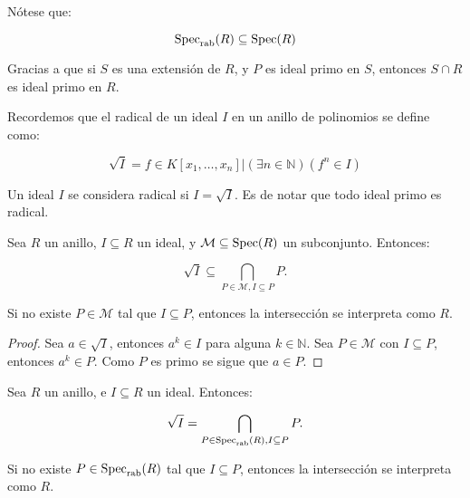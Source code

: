 Nótese que:

$$ \textrm{Spec}_{\textrm{rab}}(R) \subseteq \textrm{Spec}(R) $$

Gracias a que si $S$ es una extensión de $R$, y $P$ es ideal primo en $S$, entonces $S \cap R$ es ideal primo en $R$.

Recordemos que el radical de un ideal $I$ en un anillo de polinomios se define como:

$$\sqrt{I} = {f \in K[x_1,\dots,x_n]|(\exists n \in \mathbb{N}) (f^n \in I)}$$

Un ideal $I$ se considera radical si $I = \sqrt{I}$. Es de notar que todo ideal primo es radical.

\begin{lemma}\label{radical sub spec - nullstellensatz}
Sea $R$ un anillo, $I \subseteq R$ un ideal, y $\mathcal{M} \subseteq \textrm{Spec}(R)$ un subconjunto. Entonces:

$$\sqrt{I} \subseteq \bigcap_{P \in \mathcal{M}, I \subseteq P} P.$$

Si no existe $P \in \mathcal{M}$ tal que $I \subseteq P$, entonces la intersección se interpreta como $R$.

\end{lemma}
\begin{proof}
Sea $a \in \sqrt{I}$, entonces $a^k \in I$ para alguna $k \in \mathbb{N}$. Sea $P \in \mathcal{M}$ con $I \subseteq P$, entonces $a^k \in P$. Como $P$ es primo se sigue que $a \in P$.
\end{proof}

\begin{proposition}\label{radical = specrab - nullstellensatz}
Sea $R$ un anillo, e $I \subseteq R$ un ideal. Entonces:

$$\sqrt{I} = \bigcap_{P \in \textrm{Spec}_{\textrm{rab}}(R), I \subseteq P} P.$$

Si no existe $P \in \textrm{Spec}_{\textrm{rab}}(R)$ tal que $I \subseteq P$, entonces la intersección se interpreta como $R$.
\end{proposition}

